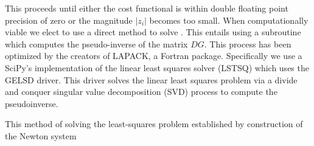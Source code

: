 This proceeds until either the cost functional is within double floating
point precision of zero or the magnitude $|z_i|$ becomes too small.
When computationally viable we elect to use a direct method to solve
. This entails using a subroutine
which computes the pseudo-inverse of the matrix $DG$. This process
has been optimized by the creators of LAPACK, a Fortran package.
Specifically we use a SciPy's implementation of the linear least
squares solver (LSTSQ) which uses the GELSD driver. This driver solves
the linear least squares problem via a divide and conquer
singular value decomposition (SVD) process to compute
the pseudoinverse.

This method of solving the least-squares problem established by
construction of the Newton system


